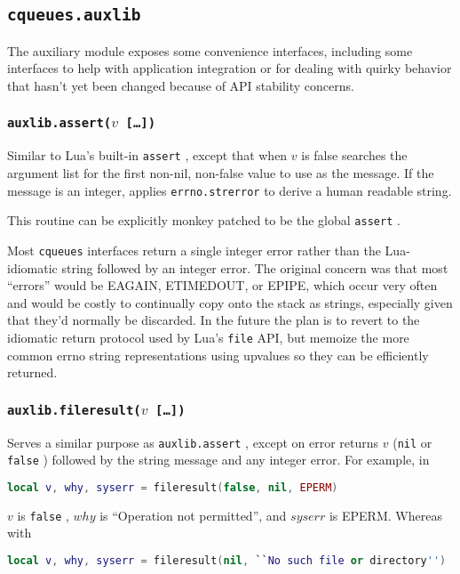 \documentclass[11pt, oneside]{memoir}
\newcommand{\cqueues}[0]{\texttt{cqueues} }
\newcommand{\fn}[1]{\texttt{#1} }
\newcommand{\false}[0]{\texttt{false} }
\newcommand{\nil}[0]{\texttt{nil} }
\newcounter{toccols}
\newenvironment{Module}[1]{
	\subsection{\texttt{#1}}
	\addtocontents{toc}{
		\protect\begin{multicols}{\value{toccols}}
	}
}{
	\addtocontents{toc}{\protect\end{multicols}}
}
\begin{document}
\begin{Module}{cqueues.auxlib}

The auxiliary module exposes some convenience interfaces, including some interfaces to help with application integration or for dealing with quirky behavior that hasn't yet been changed because of API stability concerns.

\subsubsection[\fn{auxlib.assert}]{\fn{auxlib.assert($v$ […])}}

Similar to Lua's built-in \fn{assert}, except that when $v$ is false searches the argument list for the first non-nil, non-false value to use as the message. If the message is an integer, applies \fn{errno.strerror} to derive a human readable string.

This routine can be explicitly monkey patched to be the global \fn{assert}.

Most \cqueues interfaces return a single integer error rather than the Lua-idiomatic string followed by an integer error. The original concern was that most ``errors'' would be EAGAIN, ETIMEDOUT, or EPIPE, which occur very often and would be costly to continually copy onto the stack as strings, especially given that they'd normally be discarded. In the future the plan is to revert to the idiomatic return protocol used by Lua's \fn{file} API, but memoize the more common errno string representations using upvalues so they can be efficiently returned.


\subsubsection[\fn{auxlib.fileresult}]{\fn{auxlib.fileresult($v$ […])}}

Serves a similar purpose as \fn{auxlib.assert}, except on error returns $v$ (\nil or \false) followed by the string message and any integer error. For example, in

\begin{lstlisting}[language=lua]
	local v, why, syserr = fileresult(false, nil, EPERM)
\end{lstlisting}

$v$ is \false, $why$ is ``Operation not permitted'', and $syserr$ is EPERM. Whereas with

\begin{lstlisting}[language=lua]
	local v, why, syserr = fileresult(nil, ``No such file or directory'')
\end{lstlisting}


\end{Module}
\end{document}
